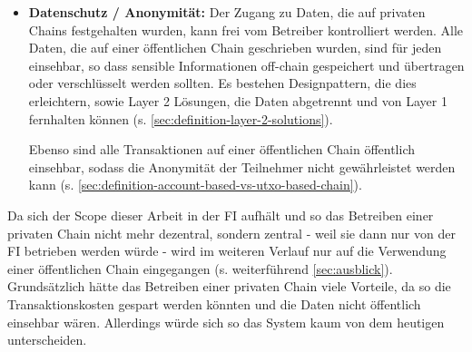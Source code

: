 \begin{itemize}
    \item \textbf{Datenschutz / Anonymität:}
    Der Zugang zu Daten, die auf privaten Chains festgehalten wurden, kann frei vom Betreiber kontrolliert werden. 
    Alle Daten, die auf einer öffentlichen Chain geschrieben wurden, sind für jeden einsehbar, so dass sensible Informationen off-chain gespeichert und übertragen  oder verschlüsselt werden sollten. 
    Es bestehen Designpattern, die dies erleichtern, sowie Layer 2 Lösungen, die Daten abgetrennt und von Layer 1 fernhalten können (s. \ref{sec:definition-layer-2-solutions}).

    Ebenso sind alle Transaktionen auf einer öffentlichen Chain öffentlich einsehbar, sodass die Anonymität der Teilnehmer nicht gewährleistet werden kann (s. \ref{sec:definition-account-based-vs-utxo-based-chain}).
\end{itemize}

\noindent
Da sich der Scope dieser Arbeit in der FI aufhält und so das Betreiben einer privaten Chain nicht mehr dezentral, sondern zentral - weil sie dann nur von der FI betrieben werden würde - wird im weiteren Verlauf nur auf die Verwendung einer öffentlichen Chain eingegangen (s. weiterführend \ref{sec:ausblick}).
Grundsätzlich hätte das Betreiben einer privaten Chain viele Vorteile, da so die Transaktionskosten gespart werden könnten und die Daten nicht öffentlich einsehbar wären.
Allerdings würde sich so das System kaum von dem heutigen unterscheiden.



